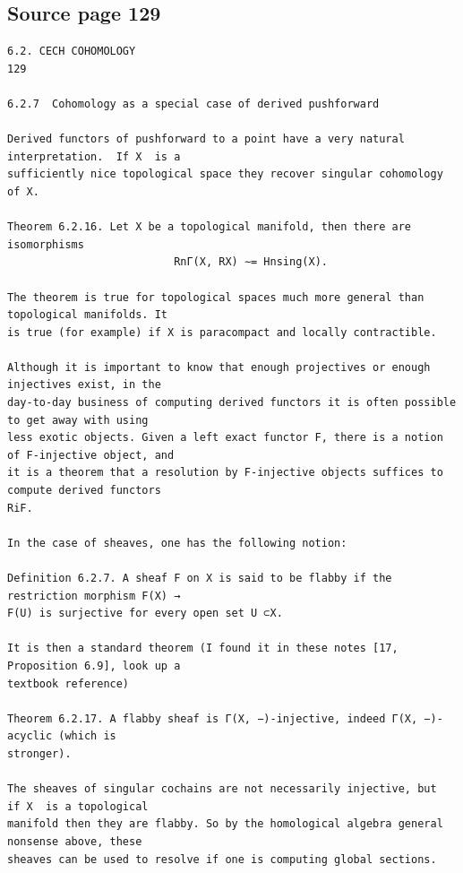 \subsection*{Source page 129}
\begin{Verbatim}[fontsize=\small]
6.2. CECH COHOMOLOGY                                                   129

6.2.7  Cohomology as a special case of derived pushforward

Derived functors of pushforward to a point have a very natural interpretation.  If X  is a
sufficiently nice topological space they recover singular cohomology of X.

Theorem 6.2.16. Let X be a topological manifold, then there are isomorphisms
                          RnΓ(X, RX) ∼= Hnsing(X).

The theorem is true for topological spaces much more general than topological manifolds. It
is true (for example) if X is paracompact and locally contractible.

Although it is important to know that enough projectives or enough injectives exist, in the
day-to-day business of computing derived functors it is often possible to get away with using
less exotic objects. Given a left exact functor F, there is a notion of F-injective object, and
it is a theorem that a resolution by F-injective objects suffices to compute derived functors
RiF.

In the case of sheaves, one has the following notion:

Definition 6.2.7. A sheaf F on X is said to be flabby if the restriction morphism F(X) →
F(U) is surjective for every open set U ⊂X.

It is then a standard theorem (I found it in these notes [17, Proposition 6.9], look up a
textbook reference)

Theorem 6.2.17. A flabby sheaf is Γ(X, −)-injective, indeed Γ(X, −)-acyclic (which is
stronger).

The sheaves of singular cochains are not necessarily injective, but  if X  is a topological
manifold then they are flabby. So by the homological algebra general nonsense above, these
sheaves can be used to resolve if one is computing global sections.


\end{Verbatim}
